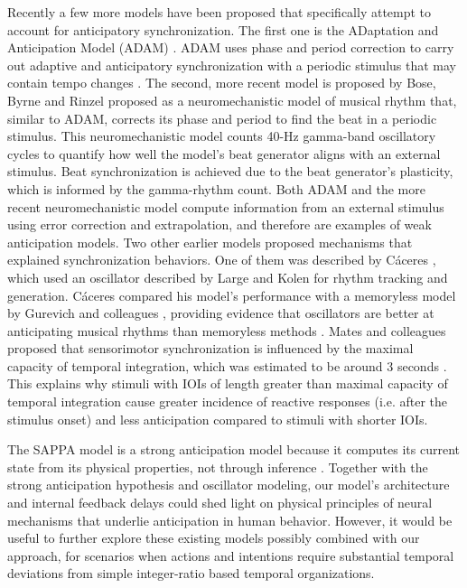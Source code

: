 \documentclass{report}
\begin{document}
Recently a few more models have been proposed that specifically attempt to account for anticipatory synchronization. The first one is the ADaptation and Anticipation Model (ADAM) \cite{van2013adaptation}. ADAM uses phase and period correction to carry out adaptive and anticipatory synchronization with a periodic stimulus that may contain tempo changes \cite{van2013adaptation}. The second, more recent model is proposed by Bose, Byrne and Rinzel \cite{bose2019neuromechanistic} proposed as a neuromechanistic model of musical rhythm that, similar to ADAM, corrects its phase and period to find the beat in a periodic stimulus. This neuromechanistic model counts 40-Hz gamma-band oscillatory cycles to quantify how well the model's beat generator aligns with an external stimulus. Beat synchronization is achieved due to the beat generator's plasticity, which is informed by the gamma-rhythm count. Both ADAM and the more recent neuromechanistic model compute information from an external stimulus using error correction and extrapolation, and therefore are examples of weak anticipation models. Two other earlier models proposed mechanisms that explained synchronization behaviors. One of them was described by C\'{a}ceres \cite{caceres2013synchronization}, which used an oscillator described by Large and Kolen \cite{large1994resonance} for rhythm tracking and generation. C\'{a}ceres compared his model's performance with a memoryless model by Gurevich and colleagues \cite{gurevish2004simulation}, providing evidence that oscillators are better at anticipating musical rhythms than memoryless methods \cite{caceres2013synchronization}. Mates and colleagues proposed that sensorimotor synchronization is influenced by the maximal capacity of temporal integration, which was estimated to be around 3 seconds \cite{mates1994temporal}. This explains why stimuli with IOIs of length greater than maximal capacity of temporal integration cause greater incidence of reactive responses (i.e. after the stimulus onset) and less anticipation compared to stimuli with shorter IOIs.

The SAPPA model is a strong anticipation model because it computes its current state from its physical properties, not through inference \cite{dubois2001incursive,stepp2010strong}. Together with the strong anticipation hypothesis and oscillator modeling, our model's architecture and internal feedback delays could shed light on physical principles of neural mechanisms that underlie anticipation in human behavior. However, it would be useful to further explore these existing models possibly combined with our approach, for scenarios when actions and intentions require substantial temporal deviations from simple integer-ratio based temporal organizations.
\end{document}
